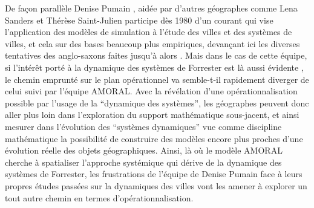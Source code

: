 
De façon parallèle Denise Pumain , aidée par d'autres géographes comme Lena Sanders et Thérèse Saint-Julien participe dès 1980 d'un courant \autocites{Pumain1983, Pumain1984, Pumain1989} qui vise l'application des modèles de simulation à l'étude des villes et des systèmes de villes, et cela sur des bases beaucoup plus empiriques, devançant ici les diverses tentatives des anglo-saxons faites jusqu'à alors \autocite[99-100]{Pumain1989}. Mais dans le cas de cette équipe, si l’intérêt porté à la dynamique des systèmes de Forrester est là aussi évidente \autocites{Pumain1983, Pumain1984}, le chemin emprunté sur le plan opérationnel va semble-t-il rapidement diverger de celui suivi par l'équipe AMORAL. Avec la révélation d'une opérationnalisation possible par l'usage de la \enquote{dynamique des systèmes}, les géographes peuvent donc aller plus loin dans l'exploration du support mathématique sous-jacent, et ainsi mesurer dans l'évolution des \enquote{systèmes dynamiques} vue comme discipline mathématique la possibilité de construire des modèles encore plus proches d'une évolution réelle des objets géographiques. Ainsi, là où le modèle AMORAL cherche à spatialiser l'approche systémique qui dérive de la dynamique des systèmes de Forrester, les frustrations de l'équipe de Denise Pumain face à leurs propres études passées sur la dynamiques des villes vont les amener à explorer un tout autre chemin en termes d'opérationnalisation. 

